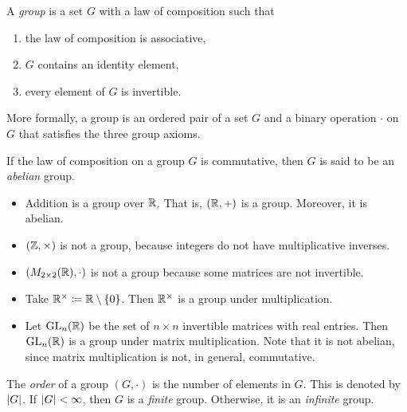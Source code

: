 \begin{definition}[Group]
  A \emph{group} is a set $G$ with a law of composition such that 
  \begin{enumerate}
    \item the law of composition is associative,
    \item $G$ contains an identity element,
    \item every element of $G$ is invertible.
  \end{enumerate}
\end{definition}

More formally, a group is an ordered pair of a set $G$ and a binary operation $\cdot$ on $G$ that satisfies the three group axioms.

\begin{definition}
  If the law of composition on a group $G$ is commutative, then $G$ is said to be an \emph{abelian} group.
\end{definition}

\begin{example} \hfill
  \begin{itemize}
    \item Addition is a group over $\mathbb{R}$. That is, $(\mathbb{R}, +)$ is a group. Moreover, it is abelian.
    \item $(\mathbb{Z}, \times)$ is not a group, because integers do not have multiplicative inverses.
    \item  $(M_{2\times 2}(\mathbb{R}), \cdot)$ is not a group because some matrices are not invertible.
    \item Take  $\mathbb{R}^{\times} \coloneq \mathbb{R}\setminus \{0\}$. Then $\mathbb{R}^{\times}$ is a group under multiplication.
    \item Let $\operatorname{GL}_n(\mathbb{R})$ be the set of $n\times n$ invertible matrices with real entries. Then $\operatorname{GL}_n(\mathbb{R})$ is a group under matrix multiplication. Note that it is not abelian, since matrix multiplication is not, in general, commutative.
  \end{itemize}
\end{example}

\begin{definition}
  The \emph{order} of a group $(G, \cdot)$ is the number of elements in $G$. This is denoted by $\lvert G\rvert$. If $\lvert G\rvert < \infty$, then $G$ is a \emph{finite} group. Otherwise, it is an \emph{infinite} group.
\end{definition}

